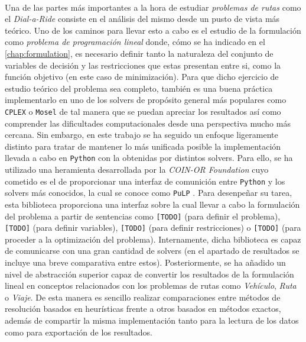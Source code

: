 \documentclass{subfiles}
\begin{document}
        \paragraph{}
        Una de las partes más importantes a la hora de estudiar \emph{problemas de rutas} como el \emph{Dial-a-Ride} consiste en el análisis del mismo desde un pusto de vista más teórico. Uno de los caminos para llevar esto a cabo es el estudio de la formulación como \emph{problema de programación lineal} donde, cómo se ha indicado en el \cref{chap:formulation}, es necesario definir tanto la naturaleza del conjunto de variables de decisión y las restricciones que estas presentan entre si, como la función objetivo (en este caso de minimización). Para que dicho ejercicio de estudio teórico del problema sea completo, también es una buena práctica implementarlo en uno de los solvers de propósito general más populares como \texttt{CPLEX} o \texttt{Mosel} de tal manera que se puedan apreciar los resultados así como comprender las dificultades computacionales desde una perspectiva mucho más cercana. Sin embargo, en este trabajo se ha seguido un enfoque ligeramente distinto para tratar de mantener lo más unificada posible la implementación llevada a cabo en \texttt{Python} con la obtenidas por distintos solvers. Para ello, se ha utilizado una heramienta desarrollada por la \emph{COIN-OR Foundation} cuyo cometido es el de proporcionar una interfaz de comunición entre \texttt{Python} y los solvers más conocidos, la cual se conoce como \texttt{PuLP} \cite{mitchell2011pulp}. Para desenpeñar su tarea, esta biblioteca proporciona una interfaz sobre la cual llevar a cabo la formulación del problema a partir de sentencias como \texttt{[TODO]} (para definir el problema), \texttt{[TODO]} (para definir variables), \texttt{[TODO]} (para definir restricciones) o \texttt{[TODO]} (para proceder a la optimización del problema). Internamente, dicha biblioteca es capaz de comunicarse con una gran cantidad de solvers (en el apartado de resultados se incluye una breve comparativa entre estos). Posteriormente, se ha añadido un nivel de abstracción superior capaz de convertir los resultados de la formulación lineal en conceptos relacionados con los problemas de rutas como \emph{Vehículo}, \emph{Ruta} o \emph{Viaje}. De esta manera es sencillo realizar comparaciones entre métodos de resolución basados en heurísticas frente a otros basados en métodos exactos, además de compartir la misma implementación tanto para la lectura de los datos como para exportación de los resultados.
\end{document}
